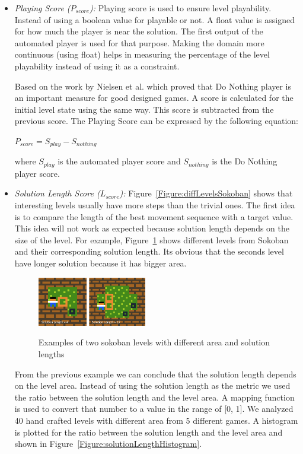 \documentclass[letterpaper]{article}
\newcommand{\figref}[1]{Figure~\ref{Figure:#1}}
\begin{document}
\begin{itemize}
	\item \emph{Playing Score ($P_{score}$):} Playing score is used to ensure level playability. Instead of using a boolean value for playable or not. A float value is assigned for how much the player is near the solution. The first output of the automated player is used for that purpose. Making the domain more continuous (using float) helps in measuring the percentage of the level playability instead of using it as a constraint.\\\par
	
	Based on the work by Nielsen et al.\cite{gvgpPerformanceProfiles} which proved that Do Nothing player is an important measure for good designed games. A score is calculated for the initial level state using the same way. This score is subtracted from the previous score. The Playing Score can be expressed by the following equation:
	\begin{center}$ P_{score} = S_{play} - S_{nothing}$\end{center}
	where $S_{play}$ is the automated player score and $S_{nothing}$ is the Do Nothing player score.
	
	\item\emph{Solution Length Score ($L_{score}$):} \figref{diffLevelsSokoban} shows that interesting levels usually have more steps than the trivial ones. The first idea is to compare the length of the best movement sequence with a target value. This idea will not work as expected because solution length depends on the size of the level. For example, \figref{sokobanLenghtArea} shows different levels from Sokoban and their corresponding solution length. Its obvious that the seconds level have longer solution because it has bigger area.
	
	\begin{figure}
	  	\centering
	    \includegraphics[width=0.45\textwidth]{Images/sokobanLenghtArea}
	    \label{Figure:sokobanLenghtArea}
	    \caption{Examples of two sokoban levels with different area and solution lengths}
	\end{figure}
	
	From the previous example we can conclude that the solution length depends on the level area. Instead of using the solution length as the metric we used the ratio between the solution length and the level area. A mapping function is used to convert that number to a value in the range of [0, 1]. We analyzed 40 hand crafted levels with different area from 5 different games. A histogram is plotted for the ratio between the solution length and the level area and shown in \figref{solutionLengthHistogram}.
	

\end{itemize}
\end{document}
